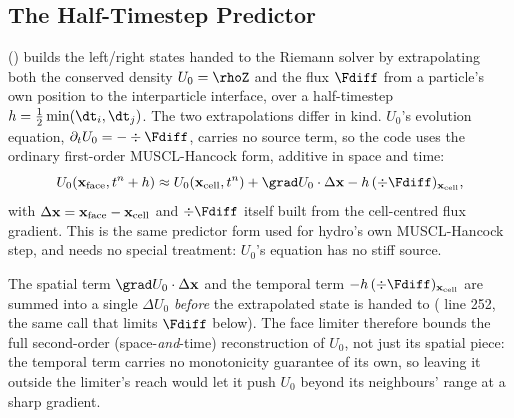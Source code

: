 \subsection{The Half-Timestep Predictor}
\label{sec:predictor}

 ()
builds the left/right states handed to the Riemann solver by
extrapolating both the conserved density $U_0=\rhoZ$ and the flux
$\Fdiff$ from a particle's own position to the interparticle interface,
over a half-timestep $h=\tfrac12\min(\dt_i,\dt_j)$. The two extrapolations
differ in kind. $U_0$'s evolution equation, $\partial_tU_0=-\div\Fdiff$,
carries no source term, so the code uses the ordinary first-order
MUSCL-Hancock form, additive in space and time:
\begin{equation}
  U_0(\mathbf x_{\rm face},t^n+h) \approx
  U_0(\mathbf x_{\rm cell},t^n) + \grad U_0\cdot\Delta\mathbf x
  - h\,(\div\Fdiff)_{\mathbf x_{\rm cell}} ,
\end{equation}
with $\Delta\mathbf x=\mathbf x_{\rm face}-\mathbf x_{\rm cell}$ and
$\div\Fdiff$ itself built from the cell-centred flux gradient. This is
the same predictor form used for hydro's own MUSCL-Hancock step, and
needs no special treatment: $U_0$'s equation has no stiff source.

The spatial term $\grad U_0\cdot\Delta\mathbf x$ and the temporal term
$-h\,(\div\Fdiff)_{\mathbf x_{\rm cell}}$ are summed into a single
$\Delta U_0$ \emph{before} the extrapolated state is handed to
 (
line 252, the same call that limits $\Fdiff$ below). The face limiter
therefore bounds the full second-order (space-\emph{and}-time)
reconstruction of $U_0$, not just its spatial piece: the temporal term
carries no monotonicity guarantee of its own, so leaving it outside the
limiter's reach would let it push $U_0$ beyond its neighbours' range at a
sharp gradient.

